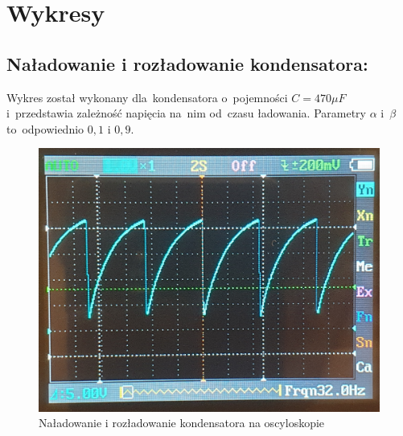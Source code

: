 \documentclass[12pt]{mwart}
\begin{document}
	\section{Wykresy}\label{wykresy}
	\subsection{Naładowanie i rozładowanie kondensatora:}
	\noindent Wykres został wykonany dla~kondensatora o~pojemności $C=470\mu F$ i~przedstawia zależność napięcia na~nim od~czasu ładowania. Parametry $\alpha$ i~$\beta$ to~odpowiednio $0,1$ i $0,9$.
	\begin{figure}[H]
		\centering
		\includegraphics[scale=0.2]{oscyloskop.jpg}
		\caption{Naładowanie i rozładowanie kondensatora na oscyloskopie}
	\end{figure}
\end{document}
